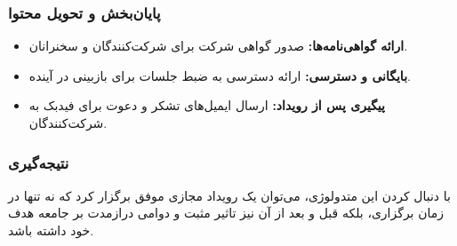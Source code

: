 \subsubsection*{پایان‌بخش و تحویل محتوا}
\begin{itemize}
	\item \textbf{ارائه گواهی‌نامه‌ها:} صدور گواهی شرکت برای شرکت‌کنندگان و سخنرانان.
	\item \textbf{بایگانی و دسترسی:} ارائه دسترسی به ضبط جلسات برای بازبینی در آینده.
	\item \textbf{پیگیری پس از رویداد:} ارسال ایمیل‌های تشکر و دعوت برای فیدبک به شرکت‌کنندگان.
\end{itemize}

\subsubsection*{نتیجه‌گیری}
با دنبال کردن این متدولوژی، می‌توان یک رویداد مجازی موفق برگزار کرد که نه تنها در زمان برگزاری، بلکه قبل و بعد از آن نیز تاثیر مثبت و دوامی درازمدت بر جامعه هدف خود داشته باشد.